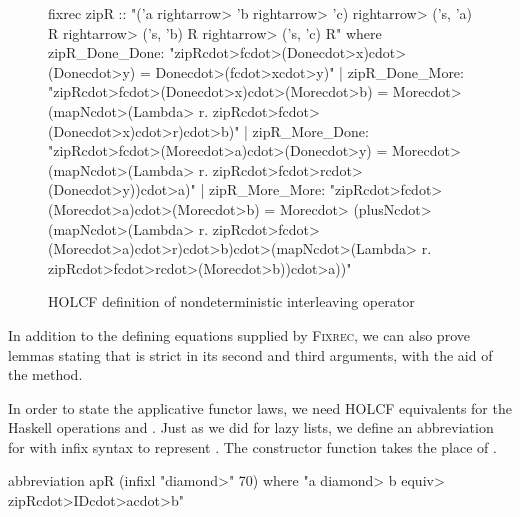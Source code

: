 \begin{figure}
\begin{isacode}
fixrec zipR :: "('a \<rightarrow> 'b \<rightarrow> 'c) \<rightarrow> ('s, 'a) R \<rightarrow> ('s, 'b) R \<rightarrow> ('s, 'c) R"
  where zipR_Done_Done:
    "zipR\<cdot>f\<cdot>(Done\<cdot>x)\<cdot>(Done\<cdot>y) = Done\<cdot>(f\<cdot>x\<cdot>y)"
  | zipR_Done_More:
    "zipR\<cdot>f\<cdot>(Done\<cdot>x)\<cdot>(More\<cdot>b) = More\<cdot>(mapN\<cdot>(\<Lambda> r. zipR\<cdot>f\<cdot>(Done\<cdot>x)\<cdot>r)\<cdot>b)"
  | zipR_More_Done:
    "zipR\<cdot>f\<cdot>(More\<cdot>a)\<cdot>(Done\<cdot>y) = More\<cdot>(mapN\<cdot>(\<Lambda> r. zipR\<cdot>f\<cdot>r\<cdot>(Done\<cdot>y))\<cdot>a)"
  | zipR_More_More:
    "zipR\<cdot>f\<cdot>(More\<cdot>a)\<cdot>(More\<cdot>b) = More\<cdot>
      (plusN\<cdot>(mapN\<cdot>(\<Lambda> r. zipR\<cdot>f\<cdot>(More\<cdot>a)\<cdot>r)\<cdot>b)\<cdot>(mapN\<cdot>(\<Lambda> r. zipR\<cdot>f\<cdot>r\<cdot>(More\<cdot>b))\<cdot>a))"
\end{isacode}
\caption{HOLCF definition of nondeterministic interleaving operator}
\label{fig:case-fixrec-zipR}
\end{figure}

In addition to the defining equations supplied by \textsc{Fixrec}, we can also prove lemmas stating that  is strict in its second and third arguments, with the aid of the  method.


In order to state the applicative functor laws, we need HOLCF equivalents for the Haskell operations \hs{(<*>)} and . Just as we did for lazy lists, we define an abbreviation for  with infix syntax to represent \hs{(<*>)}. The constructor function  takes the place of .
%
\begin{isacode}
abbreviation apR (infixl "\<diamond>" 70)
  where "a \<diamond> b \<equiv> zipR\<cdot>ID\<cdot>a\<cdot>b"
\end{isacode}


